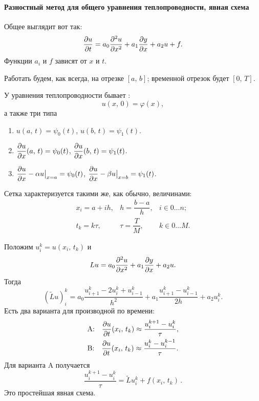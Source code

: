 \documentclass{trlnotes}
\begin{document}
    \paragraph{Разностный метод для общего уравнения теплопроводности, явная схема}

    \begin{de}
        Общее  выглядит вот так:
        \[
            \dfrac{\partial u}{\partial t} = a_0 \dfrac{\partial^2 u}{\partial x^2} + a_1 \dfrac{\partial y}{\partial x} + a_2 u + f.
        \]
        Функции $a_i$ и $f$ зависят от $x$ и $t$.
    \end{de}

    Работать будем, как всегда, на отрезке $[a, \, b]$; временной отрезок будет $[0, \, T]$.

    \begin{de}
        У уравнения теплопроводности бывает :
        \[
            u(x, \, 0) = \varphi(x),            
        \]
        а также три типа 
        \begin{enumerate}
            \item $u(a, \, t) = \psi_0(t)$, $u(b, \, t) = \psi_1(t)$.
            \item $\dfrac{\partial u}{\partial x}(a, \, t) = \psi_0(t)$, $\dfrac{\partial u}{\partial x}(b, \, t) = \psi_1(t)$.
            \item $\dfrac{\partial u}{\partial x} - \alpha u \big|_{x = a} = \psi_0(t)$, $\dfrac{\partial u}{\partial x} - \beta u \big|_{x = b} = \psi_1(t)$.
        \end{enumerate}
    \end{de}
    Сетка характеризуется такими же, как обычно, величинами:
    \[
        \begin{array}{lll}
            x_i = a + ih, & h = \dfrac{b - a}{h}, & i \in 0\ldots n; \\
            t_k = k\tau, & \tau = \dfrac{T}{M}, & k \in 0 \ldots M.
        \end{array}
    \]

    Положим $u_i^k = u(x_i, \, t_k)$ и
    \[
        Lu = a_0 \dfrac{\partial^2 u}{\partial x^2} + a_1 \dfrac{\partial y}{\partial x} + a_2 u.
    \]
    Тогда
    \[
        (\tilde{L}u)_i^k = a_0 \dfrac{u_{i+1}^k - 2u_i^k + u_{i - 1}^k}{h^2} + a_1 \dfrac{u_{i + 1}^k - u_{i - 1}^k}{2h} + a_2 u_i^k.
    \]
    Есть два варианта для производной по времени:
    \begin{align*}
        &\text{A:} \quad \dfrac{\partial u}{\partial t}(x_i, \, t_k) \approx \dfrac{u^{k + 1}_i - u^k_i}{\tau}, \\
        &\text{B:} \quad \dfrac{\partial u}{\partial t}(x_i, \, t_k) \approx \dfrac{u^{k}_i - u^{k-1}_i}{\tau}.
    \end{align*}
    Для варианта A получается 
    \[
        \boxed{\dfrac{u_i^{k + 1} - u_i^k}{\tau} = \tilde{L}u_i^k + f(x_i, \, t_k)}\,.
    \]
    Это простейшая явная схема. 
\end{document}

